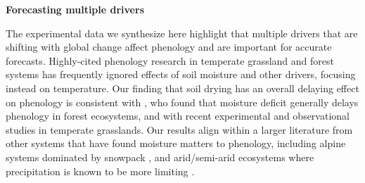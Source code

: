 \documentclass{article}
\begin{document}
\textbf {Forecasting multiple drivers} 
\par The experimental data we synthesize here highlight that multiple drivers that are shifting with global change affect phenology and are important for accurate forecasts. Highly-cited phenology research in temperate grassland and forest systems has frequently ignored effects of soil moisture and other drivers, focusing instead on temperature. Our finding that soil drying has an overall delaying effect on phenology is consistent with \citet{seyed2018}, who found that moisture deficit generally delays phenology in forest ecosystems, and with recent experimental \citep{liu2022} and observational \citep{tao2020} studies in temperate grasslands. Our results align within a larger literature from other systems that have found moisture matters to phenology, including alpine systems dominated by snowpack \citep[e.g.,][]{dunne2004,sherwood2017}, and arid/semi-arid ecosystems where precipitation is known to be more limiting \citep{tao2019}. 

\end{document}
